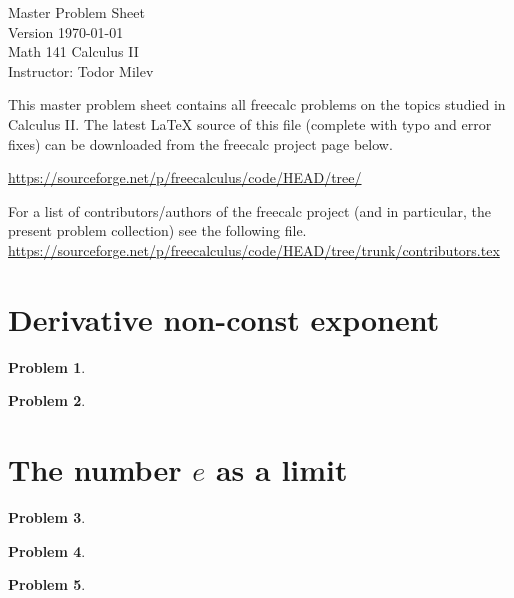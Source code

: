 \documentclass{article}
\newtheorem{problem}{Problem}
\begin{document}
\begin{center}
\Large
Master Problem Sheet \\
Version \today
 \\ Math 141 Calculus II \\ \normalsize Instructor: Todor Milev

\end{center}


This master problem sheet contains all freecalc problems on the topics studied in Calculus II. The latest \LaTeX{} source of this file (complete with typo and error fixes) can be downloaded from the freecalc project page below. 

\url{https://sourceforge.net/p/freecalculus/code/HEAD/tree/}

For a list of contributors/authors of the freecalc project (and in particular, the present problem collection) see the following file.
\url{https://sourceforge.net/p/freecalculus/code/HEAD/tree/trunk/contributors.tex}

\tableofcontents


\section{Derivative non-const exponent }
\begin{problem}

\end{problem}


\begin{problem}

\end{problem}
\section{The number $e$ as a limit}
\begin{problem}

\end{problem}

\begin{problem}

\end{problem}
\begin{problem}

\end{problem}

\end{document}
